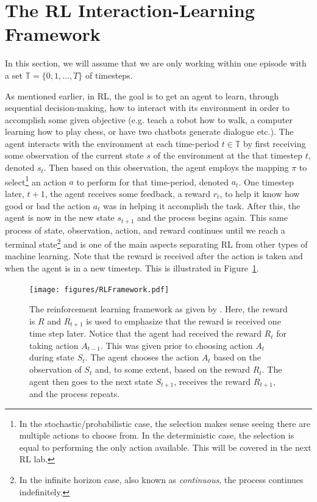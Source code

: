 \section*{The RL Interaction-Learning Framework}
In this section, we will assume that we are only working within one episode with a set $\mathbb{T}=\{0,1,\ldots,T\}$ of timesteps.

As mentioned earlier, in RL, the goal is to get an agent to learn, through sequential decision-making, how to interact with its environment in order to accomplish some given objective (e.g. teach a robot how to walk, a computer learning how to play chess, or have two chatbots generate dialogue etc.).
The agent interacts with the environment at each time-period $t\in\mathbb{T}$ by first receiving some observation of the current state $s$ of the environment at the that timestep $t$, denoted $s_t$.
Then based on this observation, the agent employs the mapping $\pi$ to select\footnote{In the stochastic/probabilistic case, the selection makes sense seeing there are multiple actions to choose from.
In the deterministic case, the selection is equal to performing the only action available. This will be covered in the next RL lab.} an action $a$ to perform for that time-period, denoted $a_t$.
One timestep later, $t+1$, the agent receives some feedback, a reward $r_{t}$, to help it know how good or bad the action $a_t$ was in helping it accomplish the task.
After this, the agent is now in the new state $s_{t+1}$ and the process begins again.
This same process of state, observation, action, and reward continues until we reach a terminal state\footnote{In the infinite horizon case, also known as \emph{continuous}, the process continues indefinitely.} and is one of the main aspects separating RL from other types of machine learning.
Note that the reward is received after the action is taken and when the agent is in a new timestep.
This is illustrated in Figure\ \ref{fig:RL_diagram}.

\begin{figure}[H]
    \centering
    \texttt{[image: figures/RLFramework.pdf]}
    \caption{The reinforcement learning framework as given by \cite{sutton2018reinforcement}.
    Here, the reward is $R$ and $R_{t+1}$ is used to emphasize that the reward is received one time step later.
    Notice that the agent had received the reward $R_t$ for taking action $A_{t-1}$.
    This was given prior to choosing action $A_t$ during state $S_t$.
    The agent chooses the action $A_t$ based on the observation of $S_t$ and, to some extent, based on the reward $R_t$.
    The agent then goes to the next state $S_{t+1}$, receives the reward $R_{t+1}$, and the process repeats.}
    \label{fig:RL_diagram}
\end{figure}

